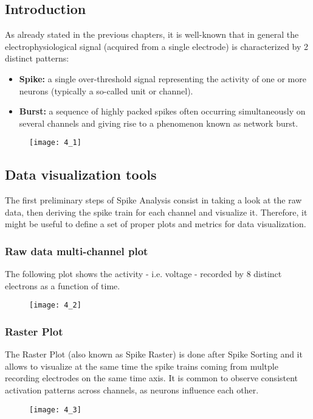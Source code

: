 \subsection{Introduction}
As already stated in the previous chapters, it is well-known that in general the electrophysiological
signal (acquired from a single electrode) is characterized by 2 distinct patterns:
\begin{itemize}
    \item \textbf{Spike:} a single over-threshold signal representing the activity of one or
    more neurons (typically a so-called unit or channel).
    \item \textbf{Burst:} a sequence of highly packed spikes often occurring simultaneously on
    several channels and giving rise to a phenomenon known as network burst.
\end{itemize}
\begin{figure}[H]
    \texttt{[image: 4\_1]}
    \centering
\end{figure}


\subsection{Data visualization tools}
The first preliminary steps of Spike Analysis consist in taking a look at the raw data, then
deriving the spike train for each channel and visualize it. Therefore, it might be useful to define
a set of proper plots and metrics for data visualization.
\subsubsection{Raw data multi-channel plot}
The following plot shows the activity - i.e. voltage - recorded by 8 distinct electrons as a
function of time.
\begin{figure}[H]
    \texttt{[image: 4\_2]}
    \centering
\end{figure}
\subsubsection{Raster Plot}
The Raster Plot (also known as Spike Raster) is done after Spike Sorting and it allows to visualize
at the same time the spike trains coming from multple recording electrodes on the same time axis.
It is common to observe consistent activation patterns across channels, as neurons influence each
other.
\begin{figure}[H]
    \texttt{[image: 4\_3]}
    \centering
\end{figure}
